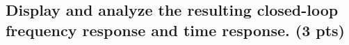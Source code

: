 \subsection{Display and analyze the resulting closed-loop frequency response and time response. (3 pts)}
\vspace{10pt}


